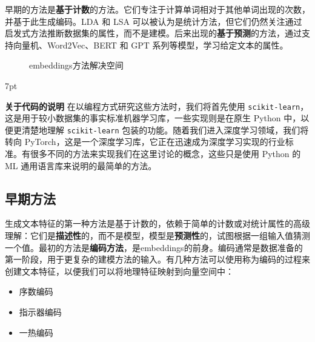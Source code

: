 \documentclass[Chinese, 11pt, table]{diazessay} %
\newenvironment{formal}{%
  \def\FrameCommand{%
	\hspace{1pt}%
	{\color{w_lightblue}\vrule width 2pt}%
	{\color{formalshade}\vrule width 4pt}%
	\colorbox{formalshade}%
  }%
  \MakeFramed{\advance\hsize-\width\FrameRestore}%
  \noindent\hspace{-4.55pt}%
  \begin{adjustwidth}{}{7pt}%
  \vspace{2pt}\vspace{2pt}%
}
{%
  \vspace{2pt}\end{adjustwidth}\endMakeFramed%
}
\begin{document}
\begin{CJK}{UTF8}{gbsn}
\begin{sloppypar}
早期的方法是\textbf{基于计数}的方法。它们专注于计算单词相对于其他单词出现的次数，并基于此生成编码。LDA 和 LSA 可以被认为是统计方法，但它们仍然关注通过启发式方法推断数据集的属性，而不是建模。后来出现的\textbf{基于预测}的方法，通过支持向量机、Word2Vec、BERT 和 GPT 系列等模型，学习给定文本的属性。

\begin{figure}[H]
    \centering
	 \caption{embeddings方法解决空间}
\end{figure}

\begin{formal}
\textbf{关于代码的说明}
在以编程方式研究这些方法时，我们将首先使用 \texttt{scikit-learn}，这是用于较小数据集的事实标准机器学习库，一些实现则是在原生 Python 中，以便更清楚地理解 \texttt{scikit-learn} 包装的功能。随着我们进入深度学习领域，我们将转向 PyTorch，这是一个深度学习库，它正在迅速成为深度学习实现的行业标准。有很多不同的方法来实现我们在这里讨论的概念，这些只是使用 Python 的 ML 通用语言库来说明的最简单的方法。
\end{formal}

\subsection{早期方法}

生成文本特征的第一种方法是基于计数的，依赖于简单的计数或对统计属性的高级理解：它们是\textbf{描述性}的，而不是模型，模型是\textbf{预测性}的，试图根据一组输入值猜测一个值。最初的方法是\textbf{编码方法}，是embeddings的前身。编码通常是数据准备的第一阶段，用于更复杂的建模方法的输入。有几种方法可以使用称为编码的过程来创建文本特征，以便我们可以将地理特征映射到向量空间中：

\begin{itemize}
  \item 序数编码   
  \item 指示器编码
  \item 一热编码
\end{itemize}


\end{sloppypar}
\end{CJK}
\end{document}
